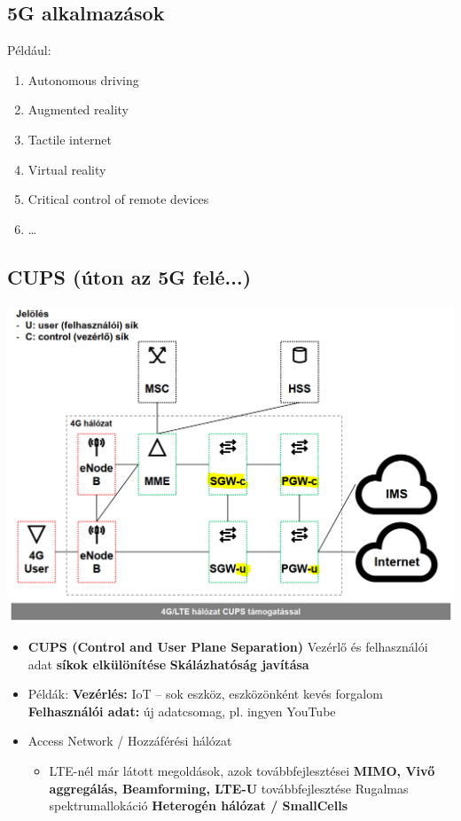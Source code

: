 \documentclass[10pt,a4paper]{article}
\begin{document}
\subsection{5G alkalmazások}
Például:
\begin{enumerate}
	\item Autonomous driving
	\item Augmented reality
	\item Tactile internet
	\item Virtual reality
	\item Critical control of remote devices
	\item \dots
\end{enumerate}
\subsection{CUPS (úton az 5G felé...)}
\begin{center}
	\includegraphics[width=0.6\linewidth]{src/cups}
\end{center}
\begin{itemize}
	\item \textbf{CUPS (Control and User Plane Separation)}
	\subitem  Vezérlő és felhasználói adat \textbf{síkok elkülönítése}
	\subitem  \textbf{Skálázhatóság javítása}
	\item Példák:
	\subitem  \textbf{Vezérlés:} IoT – sok eszköz, eszközönként kevés forgalom
	\subitem  \textbf{Felhasználói adat:} új adatcsomag, pl. ingyen YouTube
\end{itemize}
\begin{itemize}
	\item Access Network / Hozzáférési hálózat
\begin{itemize}
	\item LTE-nél már látott megoldások, azok továbbfejlesztései
	\subitem\textbf{ MIMO, Vivő aggregálás, Beamforming, LTE-U} továbbfejlesztése
	\subitem Rugalmas spektrumallokáció
	\subitem \textbf{Heterogén hálózat / SmallCells}
\end{itemize}
\end{itemize}
\end{document}

